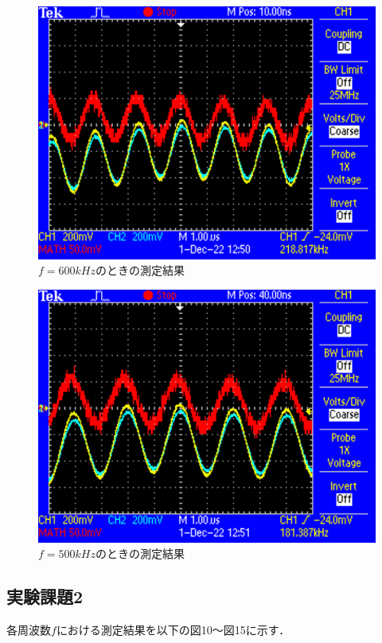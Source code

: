 \begin{figure}[H]
    \centering
    \includegraphics[scale=0.5]{F0005.pdf}
    \caption{$f=600\si{kHz}$のときの測定結果}
\end{figure}

\begin{figure}[H]
    \centering
    \includegraphics[scale=0.5]{F0006.pdf}
    \caption{$f=500\si{kHz}$のときの測定結果}
\end{figure}

\newpage

\subsection{実験課題2}
各周波数$f$における測定結果を以下の図10～図15に示す．



